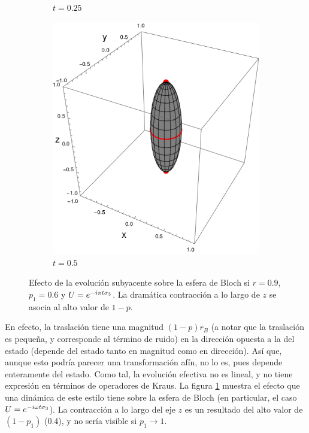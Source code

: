 \begin{figure}[ht!]
\begin{subfigure}{0.32\textwidth}
      \caption{$t=0.25$}
    \end{subfigure}
    \begin{subfigure}{0.32\textwidth}
      \centering
      \includegraphics[width=0.9\linewidth]{chapter3/figures_separable/U1xU2_H1=Pi(sz)_H2=Id_z=0.9_p=0.6t=0.5.png}
      \caption{$t=0.5$}
    \end{subfigure}
    \caption{Efecto de la evolución subyacente sobre la esfera de Bloch si $r=0.9$, $p_{1}=0.6$ y $U=e^{-i\pi t \sigma_{3}}$. La dramática contracción a lo largo de $z$ se asocia al alto valor de $1-p$.}
    \label{fig:FaseChangeSequence}
\end{figure}

En efecto, la traslación tiene una magnitud $(1-p)r_{B}$ (a notar que la traslación es pequeña, y corresponde al término de ruido) en la dirección opuesta a la del estado (depende del estado tanto en magnitud como en dirección). Así que, aunque esto podría parecer una transformación afín, no lo es, pues depende enteramente del estado. Como tal, la evolución efectiva no es lineal, y no tiene expresión en términos de operadores de Kraus. La figura \ref{fig:FaseChangeSequence} muestra el efecto que una dinámica de este estilo tiene sobre la esfera de Bloch (en particular, el caso $U=e^{-i\omega t \sigma_{3}}$). La contracción a lo largo del eje $z$ es un resultado del alto valor de $(1-p_{1})$ (0.4), y no sería visible si $p_{1}\rightarrow 1$.


